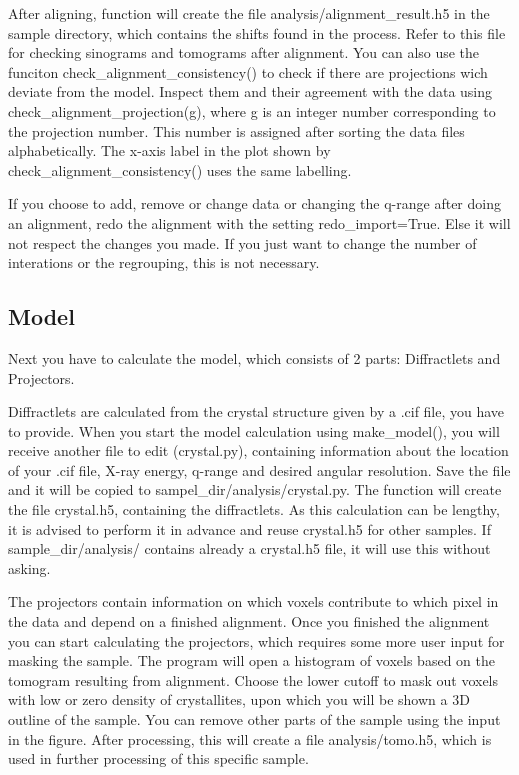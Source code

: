 After aligning, function will create the file analysis/alignment\_result.h5 in the sample directory, which contains the shifts found
in the process. Refer to this file for checking sinograms and tomograms after alignment.
You can also use the funciton check\_alignment\_consistency() to check if there are projections wich deviate from the
model. Inspect them and their agreement with the data using check\_alignment\_projection(g), where g is an integer number
corresponding to the projection number. This number is assigned after sorting the data files alphabetically.
The x-axis label in the plot shown by check\_alignment\_consistency() uses the same labelling.

If you choose to add, remove or change data or changing the q-range after doing an alignment, redo the alignment with the
setting redo\_import=True.
Else it will not respect the changes you made. If you just want to change the number of interations or the regrouping,
this is not necessary.

\subsection{Model}
Next you have to calculate the model, which consists of 2 parts: Diffractlets and Projectors.

Diffractlets are calculated from the crystal structure given by a .cif file, you have to provide.
When you start the model calculation using make\_model(), you will receive another file to edit (crystal.py), containing
information about the location of your .cif file, X-ray energy, q-range and desired angular resolution.
Save the file and it will be copied to sampel\_dir/analysis/crystal.py.
The function will create the file crystal.h5, containing the diffractlets. As this calculation can be lengthy,
it is advised to perform it in advance and reuse crystal.h5 for other samples. If sample\_dir/analysis/ contains
already a crystal.h5 file, it will use this without asking.



The projectors contain information on which voxels contribute to which pixel in the data and
depend on a finished alignment. Once you finished the alignment you can start calculating the projectors,
which requires some more user input for masking the sample. The program will open a histogram of voxels based on the
tomogram resulting from alignment. Choose the lower cutoff to mask out voxels with low or zero density of crystallites,
upon which you will be shown a 3D outline of the sample.
You can remove other parts of the sample using the input in the figure.
After processing, this will create a file analysis/tomo.h5, which is used in further processing of this specific sample.


